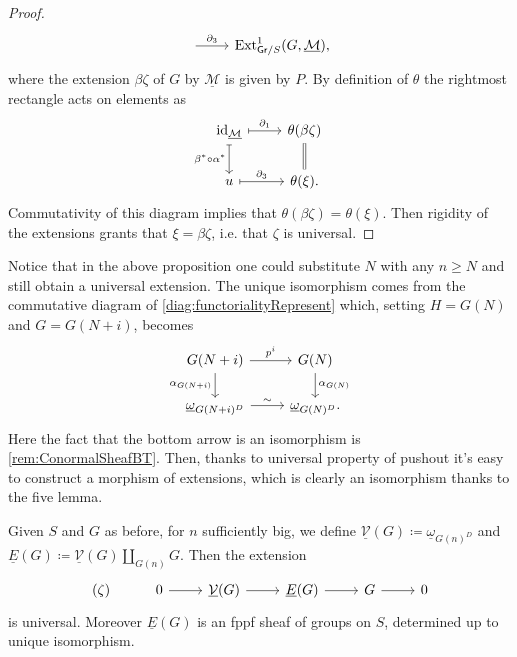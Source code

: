 \begin{proof}
\begin{equation*}
\begin{tikzcd}
		\arrow[r, "\partial_3", rightarrow] &
		\operatorname{Ext}^1_{\mathsf{Gr}/S}
		(G,\underline{\mathcal{M}})
	,\end{tikzcd}
	\end{equation*}
	where the extension $\beta\zeta$ of $G$ by $\underline{\mathcal{M}}$ is given by $P$.
	By definition of $\theta$ the rightmost rectangle acts on elements as
	\begin{equation*}
	\begin{tikzcd}
		\id_{ \underline{\mathcal{M}} }
		\arrow[r, "\partial_1", mapsto] 
		\arrow[d, "\beta^* \circ \alpha^*"', mapsto] &
		\theta(\beta\zeta)
		\arrow[d, "", equal] \\
		u \arrow[r, "\partial_3", mapsto] &
		\theta(\xi)
	.\end{tikzcd}
	\end{equation*}
	Commutativity of this diagram implies that $\theta(\beta\zeta) = \theta(\xi)$.
	Then rigidity of the extensions grants that $\xi = \beta\zeta$, i.e.
	that $\zeta$ is universal.
\end{proof}


\begin{rem}
	Notice that in the above proposition one could substitute
	$N$ with any $n \geq N$ and still obtain a universal extension.
	The unique isomorphism comes from the commutative diagram
	of \cref{diag:functorialityRepresent}
	which, setting $H = G(N)$ and $G = G(N+i)$, becomes
	\begin{equation*}
	\begin{tikzcd}
		G(N+i) \arrow[r, "p^i", rightarrow] 
		\arrow[d, "\alpha_{G(N+i)}"', rightarrow] &
		G(N) \arrow[d, "\alpha_{G(N)}", rightarrow] \\
		\underline{\omega}_{G(N+i)^D} \arrow[r, "\sim", rightarrow] &
		\underline{\omega}_{G(N)^D}
	.\end{tikzcd}
	\end{equation*}
	Here the fact that the bottom arrow is an isomorphism
	is \cref{rem:ConormalSheafBT}.
	Then, thanks to universal property of pushout it's easy to construct
	a morphism of extensions, which is clearly an isomorphism
	thanks to the five lemma.
\end{rem}


\begin{defn}[]
	Given $S$ and $G$ as before, for $n$ sufficiently big, we define
	$\underline{\mathcal{V}}(G) \coloneqq \underline{\omega}_{G(n)^D}$ and
	$\underline{E}(G) \coloneqq \underline{\mathcal{V}}(G) \amalg_{G(n)} G$.
	Then the extension
	\begin{equation*}
	\begin{tikzcd}
		(\zeta) &
		0 \arrow[r, "", rightarrow] &
		\underline{\mathcal{V}}(G) \arrow[r, "", rightarrow] &
		\underline{E}(G) \arrow[r, "", rightarrow] &
		G \arrow[r, "", rightarrow] &
		0
	\end{tikzcd}
	\end{equation*}
	is universal.
	Moreover $\underline{E}(G)$ is an fppf sheaf of groups on $S$,
	determined up to unique isomorphism.
\end{defn}


